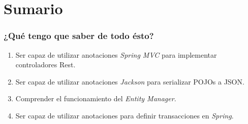 \documentclass[handout,a4paper,slidestop,xcolor=pst,blue]{beamer}
\begin{document}
\section{Sumario}

\begin{frame}[c]
    \frametitle{¿Qué tengo que saber de todo ésto?}
    \begin{enumerate}[<+->]
        \item Ser capaz de utilizar anotaciones \emph{Spring MVC} para implementar controladores Rest.
        \item Ser capaz de utilizar anotaciones \emph{Jackson} para serializar POJOs a JSON.
        \item Comprender el funcionamiento del \emph{Entity Manager}.
        \item Ser capaz de utilizar anotaciones para definir transacciones en \emph{Spring}.
    \end{enumerate}
\end{frame}
\end{document}
